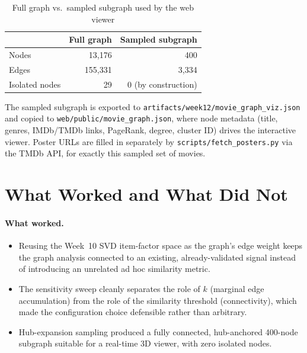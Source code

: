 \documentclass[12pt,a4paper]{article}
\begin{document}
\begin{table}[H]
\centering
\caption{Full graph vs.\ sampled subgraph used by the web viewer}
\begin{tabular}{lrr}
\toprule
 & \textbf{Full graph} & \textbf{Sampled subgraph} \\
\midrule
Nodes & 13,176 & 400 \\
Edges & 155,331 & 3,334 \\
Isolated nodes & 29 & 0 (by construction) \\
\bottomrule
\end{tabular}
\end{table}

The sampled subgraph is exported to \texttt{artifacts/week12/movie\_graph\_viz.json} and copied to
\texttt{web/public/movie\_graph.json}, where node metadata (title, genres, IMDb/TMDb links,
PageRank, degree, cluster ID) drives the interactive viewer. Poster URLs are filled in separately
by \texttt{scripts/fetch\_posters.py} via the TMDb API, for exactly this sampled set of movies.

\section{What Worked and What Did Not}

\paragraph{What worked.}
\begin{itemize}[nosep]
  \item Reusing the Week~10 SVD item-factor space as the graph's edge weight keeps the graph
    analysis connected to an existing, already-validated signal instead of introducing an
    unrelated ad hoc similarity metric.
  \item The sensitivity sweep cleanly separates the role of $k$ (marginal edge accumulation) from
    the role of the similarity threshold (connectivity), which made the configuration choice
    defensible rather than arbitrary.
  \item Hub-expansion sampling produced a fully connected, hub-anchored 400-node subgraph suitable
    for a real-time 3D viewer, with zero isolated nodes.
\end{itemize}
\end{document}
